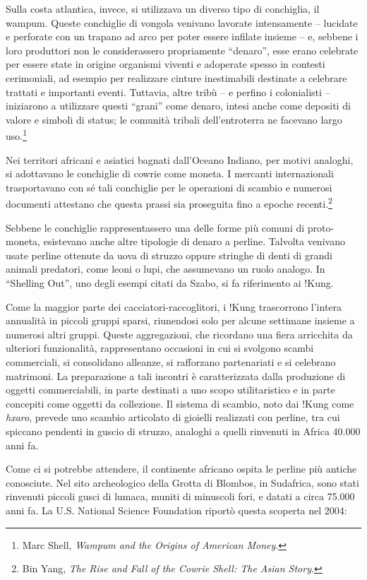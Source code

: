 \documentclass[
  a5paper,
  smalldemyvopaper,10pt,twoside,onecolumn,openright,extrafontsizes,hidelinks]{memoir}
\begin{document}
Sulla costa atlantica, invece, si utilizzava un diverso tipo di
conchiglia, il wampum. Queste conchiglie di vongola venivano lavorate
intensamente -- lucidate e perforate con un trapano ad arco per poter
essere infilate insieme -- e, sebbene i loro produttori non le
considerassero propriamente ``denaro'', esse erano celebrate per essere
state in origine organismi viventi e adoperate spesso in contesti
cerimoniali, ad esempio per realizzare cinture inestimabili destinate a
celebrare trattati e importanti eventi. Tuttavia, altre tribù -- e
perfino i colonialisti -- iniziarono a utilizzare questi ``grani'' come
denaro, intesi anche come depositi di valore e simboli di status; le
comunità tribali dell'entroterra ne facevano largo uso.\footnote{Marc
  Shell, \emph{Wampum and the Origins of American Money}.}

Nei territori africani e asiatici bagnati dall'Oceano Indiano, per
motivi analoghi, si adottavano le conchiglie di cowrie come moneta. I
mercanti internazionali trasportavano con sé tali conchiglie per le
operazioni di scambio e numerosi documenti attestano che questa prassi
sia proseguita fino a epoche recenti.\footnote{Bin Yang, \emph{The Rise
  and Fall of the Cowrie Shell: The Asian Story}.}

Sebbene le conchiglie rappresentassero una delle forme più comuni di
proto-moneta, esistevano anche altre tipologie di denaro a perline.
Talvolta venivano usate perline ottenute da uova di struzzo oppure
stringhe di denti di grandi animali predatori, come leoni o lupi, che
assumevano un ruolo analogo. In ``Shelling Out'', uno degli esempi
citati da Szabo, si fa riferimento ai !Kung.

Come la maggior parte dei cacciatori-raccoglitori, i !Kung trascorrono
l'intera annualità in piccoli gruppi sparsi, riunendosi solo per alcune
settimane insieme a numerosi altri gruppi. Queste aggregazioni, che
ricordano una fiera arricchita da ulteriori funzionalità, rappresentano
occasioni in cui si svolgono scambi commerciali, si consolidano
alleanze, si rafforzano partenariati e si celebrano matrimoni. La
preparazione a tali incontri è caratterizzata dalla produzione di
oggetti commerciabili, in parte destinati a uno scopo utilitaristico e
in parte concepiti come oggetti da collezione. Il sistema di scambio,
noto dai !Kung come \emph{hxaro}, prevede uno scambio articolato di
gioielli realizzati con perline, tra cui spiccano pendenti in guscio di
struzzo, analoghi a quelli rinvenuti in Africa 40.000 anni fa.

Come ci si potrebbe attendere, il continente africano ospita le perline
più antiche conosciute. Nel sito archeologico della Grotta di Blombos,
in Sudafrica, sono stati rinvenuti piccoli gusci di lumaca, muniti di
minuscoli fori, e datati a circa 75.000 anni fa. La U.S. National
Science Foundation riportò questa scoperta nel 2004:
\end{document}
